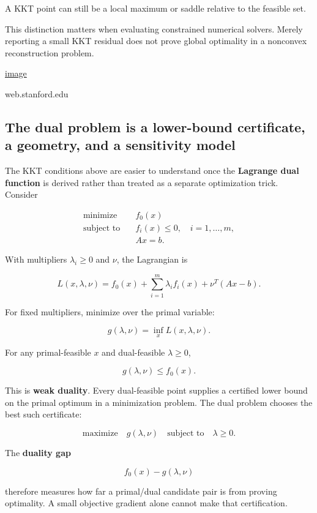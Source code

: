 A KKT point can still be a local maximum or saddle relative to the feasible set.

This distinction matters when evaluating constrained numerical solvers. Merely reporting a small KKT residual does not prove global optimality in a nonconvex reconstruction problem. 

\href{https://www.google.com/s2/favicons?domain=https://web.stanford.edu&sz=32}{image}

web.stanford.edu

\subsection{The dual problem is a lower-bound certificate, a geometry, and a sensitivity model}\label{02-foundations-ii-ch026-the-dual-problem-is-a-lower-bound-certificate-a-geometry-and-a-sensitivity-model}

The KKT conditions above are easier to understand once the \textbf{Lagrange dual function} is derived rather than treated as a separate optimization trick. Consider

\[
\begin{aligned}
\text{minimize}\quad & f_0(x)\\
\text{subject to}\quad & f_i(x)\le 0,\quad i=1,\ldots,m,\\
& Ax=b.
\end{aligned}
\]

With multipliers \(\lambda_i\ge0\) and \(\nu\), the Lagrangian is

\[
L(x,\lambda,\nu)
=
f_0(x)
+
\sum_{i=1}^{m}\lambda_i f_i(x)
+
\nu^T(Ax-b).
\]

For fixed multipliers, minimize over the primal variable:

\[
g(\lambda,\nu)
=
\inf_x L(x,\lambda,\nu).
\]

For any primal-feasible \(x\) and dual-feasible \(\lambda\ge0\),

\[
g(\lambda,\nu)
\le
f_0(x).
\]

This is \textbf{weak duality}. Every dual-feasible point supplies a certified lower bound on the primal optimum in a minimization problem. The dual problem chooses the best such certificate:

\[
\text{maximize}\quad g(\lambda,\nu)
\quad
\text{subject to}\quad \lambda\ge0.
\]

The \textbf{duality gap}

\[
f_0(x)-g(\lambda,\nu)
\]

therefore measures how far a primal/dual candidate pair is from proving optimality. A small objective gradient alone cannot make that certification.


